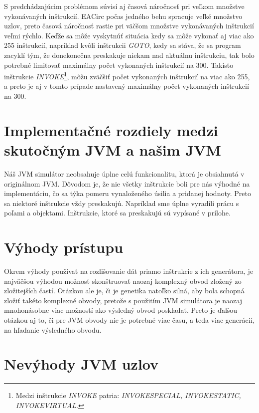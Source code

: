 S predchádzajúcim problémom súvisí aj časová náročnosť pri veľkom množstve vykonávaných inštrukcií. EACirc počas jedného behu spracuje veľké množstvo uzlov, preto časová náročnosť rastie pri väčšom množstve vykonávaných inštrukcií veľmi rýchlo. Keďže sa môže vyskytnúť situácia kedy sa môže vykonať aj viac ako 255 inštrukcií, napríklad kvôli inštrukcii \textit{GOTO}, kedy sa stáva, že sa program zacyklí tým, že donekonečna preskakuje niekam nad aktuálnu inštrukciu, tak bolo potrebné limitovať maximálny počet vykonaných inštrukcií na 300. Takisto inštrukcie \textit{INVOKE}\footnote{Medzi inštrukcie \textit{INVOKE} patria: \textit{INVOKESPECIAL, INVOKESTATIC, INVOKEVIRTUAL}.}, môžu zväčšiť počet vykonaných inštrukcií na viac ako 255, a preto je aj v tomto prípade nastavený maximálny počet vykonaných inštrukcií na 300. 

\section{Implementačné rozdiely medzi skutočným JVM a našim JVM}
\label{sec:impl-diff}

Náš JVM simulátor neobsahuje úplne celú funkcionalitu, ktorá je obsiahnutá v originálnom JVM. Dôvodom je, že nie všetky inštrukcie boli pre nás výhodné na implementáciu, čo sa týka pomeru vynaloženého úsilia a pridanej hodnoty. Preto sa niektoré inštrukcie vždy preskakujú. Napríklad sme úplne vyradili prácu s poľami a objektami. Inštrukcie, ktoré sa preskakujú sú vypísané v prílohe.

\section{Výhody prístupu}
\label{sec:advantages}

Okrem výhody používať na rozlišovanie dát priamo inštrukcie z ich generátora, je najväčšou výhodou možnosť skonštruovať naozaj komplexný obvod zložený zo zložitejších častí. Otázkou ale je, či je genetika natoľko silná, aby bola schopná zložiť takéto komplexné obvody, pretože s použitím JVM simulátora je naozaj mnohonásobne viac možností ako výsledný obvod poskladať. Preto je ďalšou otázkou aj to, či pre JVM obvody nie je potrebné viac času, a teda viac generácií, na hľadanie výsledného obvodu.

\section{Nevýhody JVM uzlov}
\label{sec:disadvantages}

